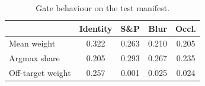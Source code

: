 \begin{table}[t]\centering\caption{Gate behaviour on the test manifest.}\label{tab:usage}
\begin{tabular}{lcccc}\toprule & Identity & S\&P & Blur & Occl.\\\midrule
Mean weight & 0.322 & 0.263 & 0.210 & 0.205\\
Argmax share & 0.205 & 0.293 & 0.267 & 0.235\\
Off-target weight & 0.257 & 0.001 & 0.025 & 0.024\\
\bottomrule\end{tabular}
\par\vspace{2pt}{\footnotesize Mean entropy 0.567 (max 1.386); 25.6\% of inputs have $\max_k w_k>0.9$, 20.3\% have $\max_k w_k<0.6$.}
\end{table}